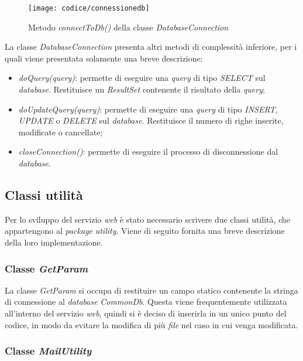 \begin{figure}[!h] 
    \centering 
    \texttt{[image: codice/connessionedb]} 
    \caption{Metodo \textit{connectToDb()} della classe \textit{DatabaseConnection}}
\end{figure}
\newpage
{}

La classe \textit{DatabaseConnection} presenta altri metodi di complessità inferiore, per i quali viene presentata solamente una breve descrizione:
\begin{itemize}
	\item \textit{doQuery(query)}: permette di eseguire una \textit{query} di tipo \textit{SELECT} sul \textit{database}. Restituisce un \textit{ResultSet} contenente il risultato della \textit{query};
	\item \textit{doUpdateQuery(query)}: permette di eseguire una \textit{query} di tipo \textit{INSERT}, \textit{UPDATE} o \textit{DELETE} sul \textit{database}. Restituisce il numero di righe inserite, modificate o cancellate;
	\item \textit{closeConnection()}: permette di eseguire il processo di disconnessione dal \textit{database}.
\end{itemize}

\subsection{Classi utilità}

Per lo sviluppo del servizio \textit{web} è stato necessario scrivere due classi utilità, che appartengono al \textit{package} \textit{utility}. Viene di seguito fornita una breve descrizione della loro implementazione.

\subsubsection{Classe \textit{GetParam}}

La classe \textit{GetParam} si occupa di restituire un campo statico contenente la stringa di connessione al \textit{database} \textit{CommonDb}. Questa viene frequentemente utilizzata all'interno del servizio \textit{web}, quindi si è deciso di inserirla in un unico punto del codice, in modo da evitare la modifica di più \textit{file} nel caso in cui venga modificata.

\subsubsection{Classe \textit{MailUtility}}

